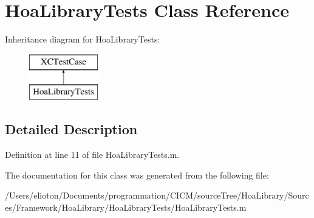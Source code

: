 \hypertarget{interface_hoa_library_tests}{\section{Hoa\-Library\-Tests Class Reference}
\label{interface_hoa_library_tests}
}
Inheritance diagram for Hoa\-Library\-Tests\-:\begin{figure}[H]
\begin{center}
\leavevmode
\includegraphics[height=2.000000cm]{interface_hoa_library_tests}
\end{center}
\end{figure}


\subsection{Detailed Description}


Definition at line 11 of file Hoa\-Library\-Tests.\-m.



The documentation for this class was generated from the following file\-:\begin{DoxyCompactItemize}
\item 
/\-Users/elioton/\-Documents/programmation/\-C\-I\-C\-M/source\-Tree/\-Hoa\-Library/\-Sources/\-Framework/\-Hoa\-Library/\-Hoa\-Library\-Tests/Hoa\-Library\-Tests.\-m\end{DoxyCompactItemize}
